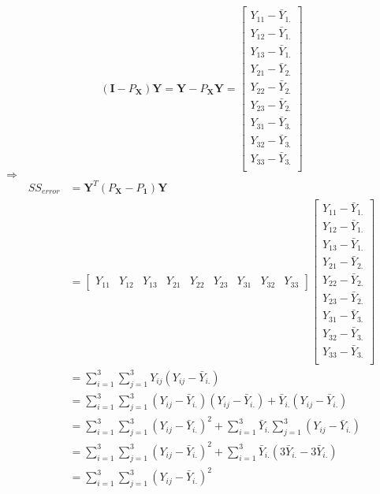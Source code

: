 \documentclass{article}
\begin{document}
\begin{enumerate}[leftmargin = 0 em, label = \arabic*., font = \bfseries]
	\newpage

	\[( \bm I - P_{\bm X})\bm Y =  \bm Y - P_{\bm X}\bm Y = \begin{bmatrix}
		Y_{11}- \bar{Y}_{1.} \\
		Y_{12}-\bar{Y}_{1.} \\
		Y_{13}-\bar{Y}_{1.} \\
		Y_{21}-\bar{Y}_{2.} \\
		Y_{22}- \bar{Y}_{2.}\\
		Y_{23} - \bar{Y}_{2.} \\
		Y_{31} - \bar{Y}_{3.} \\
		Y_{32} - \bar{Y}_{3.} \\
		Y_{33} - \bar{Y}_{3.} \\
	\end{bmatrix}\]
	$\Rightarrow$
	\begin{align*}
	SS_{error} &= \bm Y^T ( P_{\bm X} - P_{\bm 1})\bm Y\\
	& = \begin{bmatrix}
		Y_{11} & Y_{12} & Y_{13} & Y_{21} & Y_{22} & Y_{23} & Y_{31} & Y_{32} & Y_{33}
	\end{bmatrix}
	 \begin{bmatrix}
		Y_{11}- \bar{Y}_{1.} \\
		Y_{12}-\bar{Y}_{1.} \\
		Y_{13}-\bar{Y}_{1.} \\
		Y_{21}-\bar{Y}_{2.} \\
		Y_{22}- \bar{Y}_{2.}\\
		Y_{23} - \bar{Y}_{2.} \\
		Y_{31} - \bar{Y}_{3.} \\
		Y_{32} - \bar{Y}_{3.} \\
		Y_{33} - \bar{Y}_{3.} \\
	\end{bmatrix}
	\\
	&= \sum_{i = 1}^3 \sum_{j = 1}^3 Y_{ij}(Y_{ij} - \bar{Y}_{i.})\\
	& = \sum_{i = 1}^3 \sum_{j = 1}^3 (Y_{ij} - \bar{Y}_{i.})(Y_{ij} - \bar{Y}_{i.}) + \bar{Y}_{i.}(Y_{ij} - \bar{Y}_{i.})\\
	&=\sum_{i = 1}^3 \sum_{j = 1}^3 (Y_{ij} - \bar{Y}_{i.})^2 + \sum_{i = 1}^3 \bar{Y}_{i.} \sum_{j = 1}^3 (Y_{ij} - \bar{Y}_{i.})\\
	& = \sum_{i = 1}^3 \sum_{j = 1}^3 (Y_{ij} - \bar{Y}_{i.})^2 + \sum_{i = 1}^3 \bar{Y}_{i.}  (3 \bar{Y}_{i.} - 3\bar{Y}_{i.})\\
	& = \sum_{i = 1}^3 \sum_{j = 1}^3 (Y_{ij} - \bar{Y}_{i.})^2
	\end{align*}
	\end{enumerate}
	
	
\end{document}
